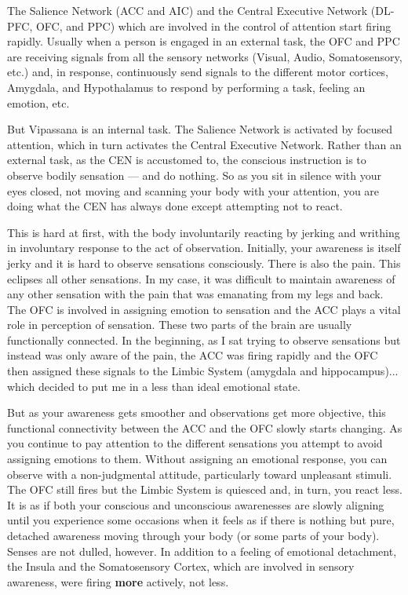 \documentclass[twocolumn]{article}
\begin{document}
The Salience Network (ACC and AIC) and the Central Executive Network (DL-PFC, OFC,
and PPC) which are involved in the control of attention start firing rapidly. Usually
when a person is engaged in an external task, the OFC and PPC are receiving signals
from all the sensory networks (Visual, Audio, Somatosensory, etc.) and, in response,
continuously send signals to the different motor cortices, Amygdala, and Hypothalamus to
respond by performing a task, feeling an emotion, etc.

But Vipassana is an internal task. The Salience Network is activated by focused
attention, which in turn activates the Central Executive Network. Rather than an
external task, as the CEN is accustomed to, the conscious instruction is to observe
bodily sensation --- and do nothing. So as you sit in silence with your eyes closed,
not moving and scanning your body with your attention, you are doing what the CEN has
always done except attempting not to react.

This is hard at first, with the body involuntarily reacting by jerking and writhing
in involuntary response to the act of observation. Initially, your awareness is
itself jerky and it is hard to observe sensations consciously. There is also the
pain. This eclipses all other sensations. In my case, it was difficult to maintain
awareness of any other sensation with the pain that was emanating from my legs and
back. The OFC is involved in assigning emotion to sensation \cite{ofcemotion} and the
ACC plays a vital role in perception of sensation. These two parts of the brain are
usually functionally connected. In the beginning, as I sat trying to observe
sensations but instead was only aware of the pain, the ACC was firing rapidly and the
OFC then assigned these signals to the Limbic System (amygdala and
hippocampus)... which decided to put me in a less than ideal emotional state.

But as your awareness gets smoother and observations get more objective, this
functional connectivity between the ACC and the OFC slowly starts changing. As you
continue to pay attention to the different sensations you attempt to avoid assigning
emotions to them. Without assigning an emotional response, you can observe with a
non-judgmental attitude, particularly toward unpleasant stimuli. The OFC still fires
but the Limbic System is quiesced and, in turn, you react less. It is as if both your
conscious and unconscious awarenesses are slowly aligning until you experience some
occasions when it feels as if there is nothing but pure, detached awareness moving
through your body (or some parts of your body). Senses are not dulled, however. In
addition to a feeling of emotional detachment, the Insula and the Somatosensory
Cortex, which are involved in sensory awareness, were firing \textbf{more} actively,
not less.
\end{document}

